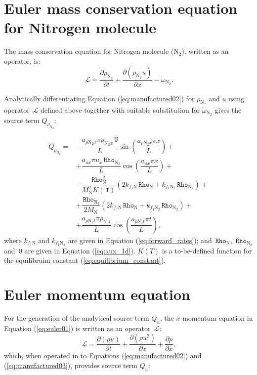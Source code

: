 \documentclass[10pt]{article}
\newcommand{\Diff}[2] {\dfrac{\partial( #1)}{\partial #2}}
\newcommand{\diff}[2] {\dfrac{\partial #1 }{\partial #2}}
\newcommand{\Lo}{\,\mathcal{L}}
\newcommand{\Rho}{\,\mathtt{Rho}}
\newcommand{\T}{\,\mathtt{T}}
\newcommand{\U}{\,\mathtt{U}}
\begin{document}
\section{Euler mass conservation equation for Nitrogen molecule}

The mass conservation equation for Nitrogen molecule ($\text{N}_2$), written as an operator, is:
\begin{equation*}
 \label{eq:euler1d_11a}
\Lo =  \diff{\rho_{\text{N}_2}  }{t} +\Diff{\rho_{\text{N}_2} u }{x} - \dot{\omega}_{\text{N}_2}.
\end{equation*}

Analytically differentiating Equation (\ref{eq:manufactured02}) for $\rho_{\text{N}_2}$ and $u$ using operator $\Lo$ defined above together with suitable substitution for $\dot{\omega}_{\text{N}_2}$ gives the source term $Q_{\rho_{\text{N}_2}}$:

\begin{equation}
\begin{split}
Q_{\rho_{\text{N}_2}}=&-\dfrac{a_{ \rho \text{N}_2 x} \pi \rho_{\text{N}_2  x} \U }{L}\sin\left(\dfrac{a_{ \rho \text{N}_2 x} \pi x}{L}\right)+\\
&+\dfrac{a_{ux} \pi u_x \Rho_{\text{N}_2} }{L}\cos\left(\dfrac{a_{ux} \pi x}{L}\right)+\\
&-\dfrac{\Rho_\text{N}^2}{M_{\text{N}}^2 K(\T)} \left(2 k_{f_1 \text{N}} \Rho_\text{N}+k_{f_1 \text{N}_2} \Rho_{\text{N}_2}\right) +\\
&+\dfrac{\Rho_{\text{N}_2}}{2M_{\text{N}}}\left(2 k_{f_1 \text{N}} \Rho_\text{N}+k_{f_1 \text{N}_2} \Rho_{\text{N}_2}\right) +\\
&+ \dfrac{a_{ \rho \text{N}_2 t} \pi \rho_{\text{N}_2 t} }{L} \cos\left(\dfrac{a_{ \rho \text{N}_2 t} \pi t}{L}\right),
\end{split}
\end{equation}
where  $k_{f_1 \text{N}}$ and $k_{f_1 \text{N}_2}$ are given in Equation (\ref{eq:forward_rates}); and $\Rho_{\text{N}},\,\Rho_{\text{N}_2}$ and $\U$ are given in Equation (\ref{eq:aux_1d}). $K(T)$ is a to-be-defined function for the equilibruim constant (\ref{eq:equilibrium_constant}).


\section{Euler momentum equation}

For the generation of the analytical source term $Q_u$, the $x$ momentum equation in Equation (\ref{eq:euler01}) is written as an operator $\Lo$:
\begin{equation*}
 \label{eq:euler1d_12}
\Lo = \Diff{\rho u  }{t} + \Diff{\rho u^2}{x} + \diff{p}{x},
\end{equation*}
which, when operated in to Equations (\ref{eq:manufactured02}) and (\ref{eq:manufactured03}), provides source term $Q_{u}$:
\end{document}
